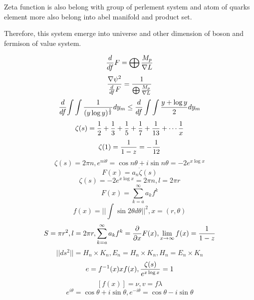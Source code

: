 \documentclass{jsarticle}
\begin{document}
    Zeta function is also belong with group of perlement system and atom
  of quarks element more also belong into abel manifold and product set.
 

    Therefore, this system emerge into universe and other dimension of 
  boson and fermison of value system.

  $$ {d \over df}F = \bigoplus{M_p \over \nabla L} $$
  $$ {\nabla \psi^2 \over {d \over df}F} = {1 \over {\bigoplus {M_p \over 
  \nabla L}}} $$
  $$ {d \over df}{\int \int {1 \over (y \log y)^{1 \over 2}}}dy_m \le 
  {d \over df}\int \int {{y + \log y} \over 2}dy_m $$
  $$ \zeta(s) = {{1 \over 2} + {1 \over 3} + {1 \over 5} + {1 \over 7}
  + {1 \over 13} + \cdots {1 \over x}} $$
  $$ \zeta(1) = {1 \over 1 - z} = -{1 \over 12} $$
  $$ \zeta(s) = 2 \pi n, e^{n i \theta} = \cos n \theta + i \sin n \theta
  = -2 e^{x \log x} $$
  $$ F(x) = a_n \dot \zeta(s) $$
  $$ \zeta(s) = - 2 e^{x \log x} = 2 \pi n, l = 2 \pi r  $$
  $$ F(x) = \sum_{k=a}^{\infty} a_k f^k $$
  $$ f(x) = ||\int \sin 2 \theta d \theta||^2, x = (r, \theta)  $$
  $$ S = \pi r^2, l = 2 \pi r, \sum_{k=a}^{\infty} a_k f^k = 
  {\partial \over \partial x}F(x), \lim_{x \to \infty}f(x) = 
  {1 \over {1 - z}} $$
  $$ ||ds^2|| = H_n \times K_n, E_n = H_n \times K_n, H_n = E_n \times K_n $$
  $$ e = f^{-1}(x)xf(x), {\zeta(s) \over e^{x \log x}} = 1 $$
  $$ [f(x)] = \nu, v = f \lambda $$
  $$ e^{i \theta} = \cos \theta + i \sin \theta, e^{-i \theta} = 
  \cos \theta - i \sin \theta $$

  
\end{document}

